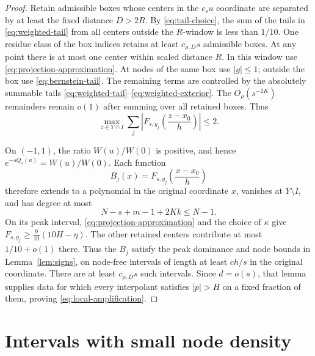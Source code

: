 \documentclass[11pt]{article}
\theoremstyle{definition}
\numberwithin{equation}{section}
\begin{document}
\begin{proof}
Retain admissible boxes whose centers in the \(c_su\) coordinate
are separated by at least the fixed distance \(D>2R\). By
\eqref{eq:tail-choice}, the sum of the tails in
\eqref{eq:weighted-tail} from all centers outside the \(R\)-window is
less than \(1/10\).
One residue class of the box indices retains at least
\(c_{\rho,D}s\) admissible boxes.
At any point there is at most one center within scaled distance \(R\).
In this window use \eqref{eq:projection-approximation}.
At nodes of the same box use \(|g|\le1\); outside the box use
\eqref{eq:bernstein-tail}. The remaining terms are controlled by
the absolutely summable tails
\eqref{eq:weighted-tail}--\eqref{eq:weighted-exterior}.
The \(O_\rho(s^{-2K})\) remainders remain \(o(1)\) after summing
over all retained boxes. Thus
\begin{equation}\label{eq:sum-node-bound}
 \max_{z\in Y\cap I}\sum_j
 \left|F_{s,y_j}\left(\frac{z-x_0}{h}\right)\right|\le2.
\end{equation}

On \((-1,1)\), the ratio \(W(u)/W(0)\) is positive, and hence
\(e^{-sQ_s(u)}=W(u)/W(0)\).
Each function
\[
 B_j(x)=F_{s,y_j}\left(\frac{x-x_0}{h}\right)
\]
therefore extends to a polynomial in the original coordinate \(x\),
vanishes at \(Y\setminus I\), and has degree at most
\begin{equation}\label{eq:degree-budget}
 N-s+m-1+2Kk\le N-1.
\end{equation}
On its peak interval, \eqref{eq:projection-approximation} and the
choice of \(\kappa\) give \(F_{s,y_j}\ge\frac9{10}(10H-\eta)\).
The other retained centers contribute at most \(1/10+o(1)\) there.
Thus the \(B_j\) satisfy the peak dominance and node bounds in
Lemma~\ref{lem:signs}, on node-free intervals of length at least
\(ch/s\) in the original coordinate. There are at least
\(c_{\rho,D}s\) such intervals. Since \(d=o(s)\), that lemma
supplies data for which every interpolant satisfies \(|p|>H\) on
a fixed fraction of them, proving \eqref{eq:local-amplification}.
\end{proof}

\section{Intervals with small node density}\label{sec:sparse}
\end{document}

